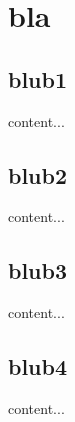 \documentclass[11pt]{beamer}
\begin{document}
\section{bla}
\subsection{blub1}
\begin{frame}
content...
\end{frame}
\subsection{blub2}
\begin{frame}
content...
\end{frame}
\subsection{blub3}
\begin{frame}
content...
\end{frame}
\subsection{blub4}
\begin{frame}
content...
\end{frame}
\end{document}
